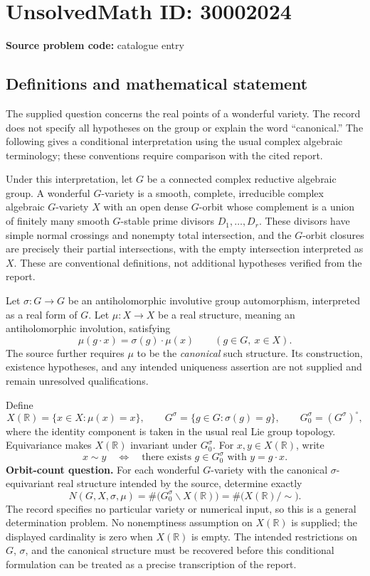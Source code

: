 \documentclass[11pt]{article}
\newcommand{\R}{\mathbb{R}}
\begin{document}
\section*{UnsolvedMath ID: 30002024}
\textbf{Source problem code:} catalogue entry
\subsection{Definitions and mathematical statement}
The supplied question concerns the real points of a wonderful variety. The record does not specify all hypotheses on the group or explain the word ``canonical.'' The following gives a conditional interpretation using the usual complex algebraic terminology; these conventions require comparison with the cited report.

Under this interpretation, let \(G\) be a connected complex reductive algebraic group. A wonderful \(G\)-variety is a smooth, complete, irreducible complex algebraic \(G\)-variety \(X\) with an open dense \(G\)-orbit whose complement is a union of finitely many smooth \(G\)-stable prime divisors \(D_1,\ldots,D_r\). These divisors have simple normal crossings and nonempty total intersection, and the \(G\)-orbit closures are precisely their partial intersections, with the empty intersection interpreted as \(X\). These are conventional definitions, not additional hypotheses verified from the report.

Let \(\sigma:G\to G\) be an antiholomorphic involutive group automorphism, interpreted as a real form of \(G\). Let \(\mu:X\to X\) be a real structure, meaning an antiholomorphic involution, satisfying
\[
\mu(g\cdot x)=\sigma(g)\cdot\mu(x)
\qquad(g\in G,\ x\in X).
\]
The source further requires \(\mu\) to be the \emph{canonical} such structure. Its construction, existence hypotheses, and any intended uniqueness assertion are not supplied and remain unresolved qualifications.

Define
\[
X(\R)=\{x\in X:\mu(x)=x\},\qquad
G^\sigma=\{g\in G:\sigma(g)=g\},\qquad
G_0^\sigma=(G^\sigma)^\circ,
\]
where the identity component is taken in the usual real Lie group topology. Equivariance makes \(X(\R)\) invariant under \(G_0^\sigma\). For \(x,y\in X(\R)\), write
\[
x\sim y\quad\Longleftrightarrow\quad
\text{there exists }g\in G_0^\sigma\text{ with }y=g\cdot x.
\]
\textbf{Orbit-count question.} For each wonderful \(G\)-variety with the canonical \(\sigma\)-equivariant real structure intended by the source, determine exactly
\[
N(G,X,\sigma,\mu)
=\#\bigl(G_0^\sigma\backslash X(\R)\bigr)
=\#\bigl(X(\R)/{\sim}\bigr).
\]
The record specifies no particular variety or numerical input, so this is a general determination problem. No nonemptiness assumption on \(X(\R)\) is supplied; the displayed cardinality is zero when \(X(\R)\) is empty. The intended restrictions on \(G\), \(\sigma\), and the canonical structure must be recovered before this conditional formulation can be treated as a precise transcription of the report.
\end{document}
